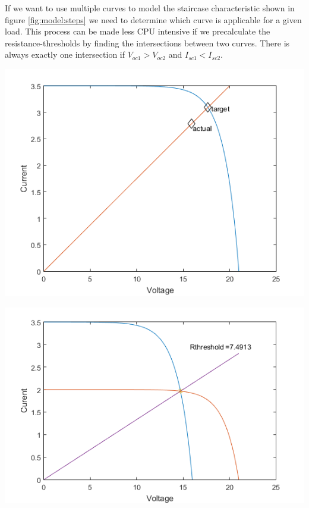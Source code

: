 If we want to use multiple curves to model the staircase characteristic shown in
figure \ref{fig:model:steps} we  need to determine which curve is applicable for
a given load. This process can be made less CPU intensive if we precalculate the
resistance-thresholds by finding the intersections between two curves.  There is
always exactly one intersection if  $V_{oc1} > V_{oc2}$ and $I_{sc1} < I_{sc2}$.

\begin{minipage}{0.5\textwidth}
	\center
    \includegraphics[width=.95\textwidth]{images/model/approx.png}
    \label{fig:model:approx}
\end{minipage}
\begin{minipage}{0.5\textwidth}
	\center
    \includegraphics[width=.95\textwidth]{images/model/threshold.png}
    \label{fig:model:threshold}
\end{minipage}
